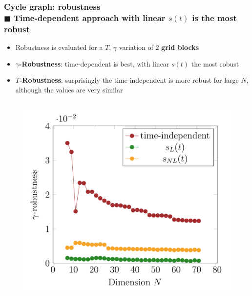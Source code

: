 \documentclass{beamer}
\newcommand{\bb}[1]{\textbf{\textcolor{darkish_blue}{#1}}}
\begin{document}
\begin{frame}
\frametitle{Cycle graph: robustness \\ \normalsize $\blacksquare$ Time-dependent approach with linear $s(t)$ is the most robust}

\begin{itemize}
	\item Robustness is evaluated for a $T$, $\gamma$ variation of $2$ \bb{grid blocks}
	\item \bb{$\gamma$-Robustness}: time-dependent is best, with linear $s(t)$ the most robust
	\item \bb{$T$-Robustness}: surprisingly the time-independent is more robust for large $N$, although the values are very similar
\end{itemize}

\begin{columns}
	\begin{column}[T]{0.4\textwidth}
		\begin{figure}
		\centering
			\includegraphics[width=\textwidth]{gamma_robustness.png}
		\end{figure}
	\end{column}


\end{columns}
\end{frame}
\end{document}
